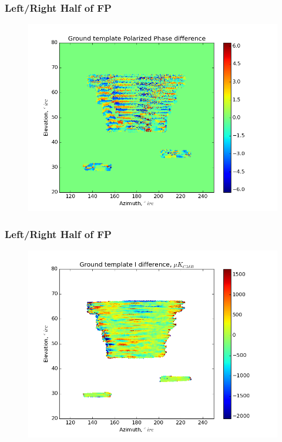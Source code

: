 \documentclass{beamer}
\begin{document}
\begin{frame}
\frametitle{Left/Right Half of FP}
\begin{figure}
\includegraphics[width=0.9\linewidth]{dArg_gt_LHS_RHS.png}
\end{figure}
\end{frame}

\begin{frame}
\frametitle{Left/Right Half of FP}
\begin{figure}
\includegraphics[width=0.9\linewidth]{dI_gt_LHS_RHS.png}
\end{figure}
\end{frame}
\end{document}
